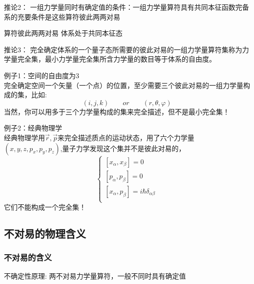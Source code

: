 \begin{frame}
    \begin{tcolorbox1}{推论2：}
        一组力学量同时有确定值的条件：一组力学量算符具有共同本征函数完备系的充要条件是这些算符彼此两两对易
    \begin{enumerate}
    \Item 算符彼此两两对易
    \Item 体系处于共同本征态
    \end{enumerate}
    \end{tcolorbox1}

\end{frame} 

\begin{frame} [allowframebreaks=]
    \begin{tcolorbox1}{推论3：}
        完全确定体系的一个量子态所需要的彼此对易的一组力学量算符集称为力学量完全集，最小力学量完全集所含力学量的数目等于体系的自由度。
    \end{tcolorbox1}
    \alert{例子1：空间的自由度为3} \\
    完全确定空间一个矢量（一个点）的位置，至少需要三个彼此对易的一组力学量构成的集，比如: $$(i,j,k) \qquad or \qquad (r,\theta,\varphi) $$
    当然，你可以用多于三个力学量构成的集来完全描述，但不是最小完全集！\\
\end{frame} 

\begin{frame}
    \alert{例子2：经典物理学} \\
    经典物理学用$\vec{r}, \vec{p}$来完全描述质点的运动状态，用了六个力学量$(x,y,z, p_x, p_y, p_z)$,量子力学发现这个集并不是彼此对易的，
    $$\begin{cases}
        [x_\alpha,x_\beta]= 0  \\ 
        [p_\alpha,p_\beta]= 0  \\ 
        [x_\alpha,p_\beta]= i\hbar \delta_{\alpha\beta}  \\ 
    \end{cases}$$
    它们不能构成一个完全集！
\end{frame} 

\subsection{不对易的物理含义}

\begin{frame} 
    \frametitle{不对易的含义}
    \begin{tcolorbox1}{不确定性原理:}
        两不对易力学量算符，一般不同时具有确定值    
    \end{tcolorbox1}
\end{frame} 

